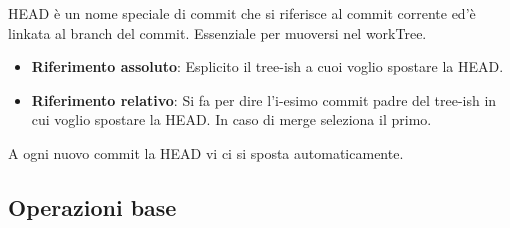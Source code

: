 HEAD è un nome speciale di commit che si riferisce al commit corrente ed'è linkata al branch del commit. Essenziale per muoversi nel workTree.

\begin{itemize}
	\item \textbf{Riferimento assoluto}: Esplicito il tree-ish a cuoi voglio spostare la HEAD.

	\item \textbf{Riferimento relativo}: Si fa  per dire l'i-esimo commit padre del tree-ish in cui voglio spostare la HEAD. In caso di merge seleziona il primo.
\end{itemize}

A ogni nuovo commit la HEAD vi ci si sposta automaticamente.

\subsection{Operazioni base}
